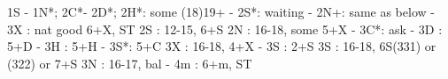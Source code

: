 1S - 1N*; 2C*- 2D*; 
2H*: some (18)19+
   - 2S*: waiting
   		- 2N+: same as below
   - 3X : nat good 6+X, ST
2S : 12-15, 6+S
2N : 16-18, some 5+X
   - 3C*: ask
		- 3D : 5+D
		- 3H : 5+H
		- 3S*: 5+C
3X : 16-18, 4+X
   - 3S : 2+S
3S : 16-18, 6S(331) or (322) or 7+S
3N : 16-17, bal
   - 4m : 6+m, ST